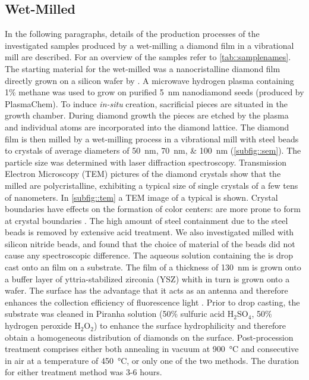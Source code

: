 	\subsection{Wet-Milled \cvd \Nds}\label{subsec::milled_nds}
	In the following paragraphs, details of the production processes of the investigated samples produced by a wet-milling a \CVD diamond film in a vibrational mill are described. 
	For an overview of the samples refer to \autoref{tab::samplenames}.
	The starting material for the wet-milled \nds was a nanocristalline diamond film \cite{Williams2006a} directly grown on a silicon wafer by \CVD. 
	A microwave hydrogen plasma containing 1\% methane was used to grow on purified \SI{5}{\nano\meter} nanodiamond seeds (produced by PlasmaChem).
	To induce \textit{in-situ} \siv creation, sacrificial \Si pieces are situated in the growth chamber.
	During diamond growth the \Si pieces are etched by the plasma and individual atoms are incorporated into the diamond lattice.
	The diamond film is then milled by a wet-milling process in a vibrational mill with steel beads to crystals of average diameters of \SIlist{50; 70; 100}{\nano\meter} (\autoref{subfig::sem}).
	The particle size was determined with laser diffraction spectroscopy.
	Transmission Electron Microscopy (TEM) pictures of the diamond crystals show that the milled \nds are polycristalline, exhibiting a typical size of single crystals of a few tens of nanometers.
	In \autoref{subfig::tem} a TEM image of a typical \nd is shown.
	Crystal boundaries have effects on the formation of color centers:
	\sivs are more prone to form at crystal boundaries \cite{Zapol2001}.
	The high amount of steel containment due to the steel beads is removed by extensive acid treatment.
	We also investigated \nds milled with silicon nitride beads, and found that the choice of material of the beads did not cause any spectroscopic difference.
	The aqueous solution containing the \nds is drop cast onto an \ir film on a \Si substrate.
	The \ir film of a thickness of \SI{130}{nm} is grown onto a buffer layer of yttria-stabilized zirconia (YSZ) whith in turn is grown onto a \Si wafer.
	The \ir surface has the advantage that it acts as an antenna and therefore enhances the collection efficiency of fluorescence light \cite{Neu2012a}.
	Prior to drop casting, the substrate was cleaned in Piranha solution (50\% sulfuric acid H$_2$SO$_4$, 50\% hydrogen peroxide H$_2$O$_2$) to enhance the surface hydrophilicity and therefore obtain a homogeneous distribution of diamonds on the surface.
	Post-procession treatment comprises either both annealing in vacuum at \SI{900}{\degreeCelsius} and consecutive \ox in air at a temperature of \SI{450}{\degreeCelsius}, or only one of the two methods.
	The duration for either treatment method was 3-6 hours.
	\\
